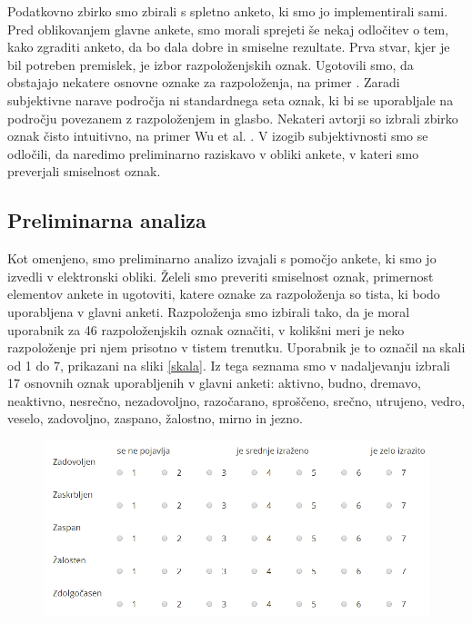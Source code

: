 \documentclass[a4paper, 12pt]{book}
\begin{document}
{Podatkovno zbirko smo zbirali s spletno anketo, ki smo jo implementirali sami. Pred oblikovanjem glavne ankete, smo morali sprejeti še nekaj odločitev o tem, kako zgraditi anketo, da bo dala dobre in smiselne rezultate. Prva stvar, kjer je bil potreben premislek, je izbor razpoloženjskih oznak. Ugotovili smo, da obstajajo nekatere osnovne oznake za razpoloženja, na primer \cite{dalgleish1999handbook}. Zaradi subjektivne narave področja ni standardnega seta oznak, ki bi se uporabljale na področju povezanem z razpoloženjem in glasbo. Nekateri avtorji so izbrali zbirko oznak čisto intuitivno, na primer Wu et al. \cite{Wu2013}. V izogib subjektivnosti smo se odločili, da naredimo preliminarno raziskavo v obliki ankete, v kateri smo preverjali smiselnost oznak. 

\subsection{Preliminarna analiza}
\label{preiliminarnaana}

Kot omenjeno, smo preliminarno analizo izvajali s pomočjo ankete, ki smo jo izvedli v elektronski obliki. Želeli smo preveriti smiselnost oznak, primernost elementov ankete in ugotoviti, katere oznake za razpoloženja so tista, ki bodo uporabljena v glavni anketi. Razpoloženja smo izbirali tako, da je moral uporabnik za 46 razpoloženjskih oznak označiti, v kolikšni meri je neko razpoloženje pri njem prisotno v tistem trenutku. Uporabnik je to označil na skali od 1 do 7, prikazani na sliki \ref{skala}. Iz tega seznama smo v nadaljevanju izbrali 17 osnovnih oznak uporabljenih v glavni anketi: aktivno, budno, dremavo, neaktivno, nesrečno, nezadovoljno, razočarano, sproščeno, srečno, utrujeno, vedro, veselo, zadovoljno, zaspano, žalostno, mirno in jezno.

\begin{figure}[ht]
\centering
\includegraphics[width=13cm]{images/likart.png}


\end{figure}}
\end{document}
